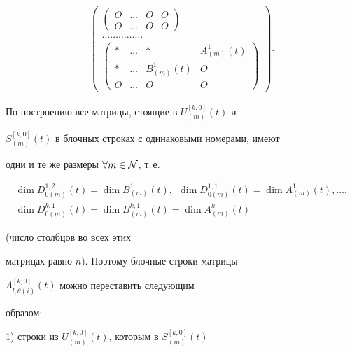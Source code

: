 \begin{pf}
\begin{gather*}
\begin{pmatrix}
\begin{pmatrix}
O & \dotsc & O & O \\


O & \dotsc & O & O 


\end{pmatrix} \\


\dotsc\dotsc\dotsc \dotsc \dotsc\\


\begin{pmatrix}


\ast & \dotsc & \ast & A_{(m)}^{1}(t) \\


\ast & \dotsc & B_{(m)}^1(t) & O \\


O & \dotsc & O & O 


\end{pmatrix}


\end{pmatrix}.


\end{gather*}





По построению все матрицы, стоящие в $U_{(m)}^{[k,0]}(t)$ и


$S_{(m)}^{[k,0]}(t)$ в блочных строках с одинаковыми номерами, имеют 


одни и те же размеры $\forall m \in \cal N$, т.\,е.


\begin{gather*}


\dim 


D_{0(m)}^{1,2}(t)=\dim B_{(m)}^1(t), \ \  \dim D_{0(m)}^{1,1}(t)=\dim 


A_{(m)}^1(t),\dotsc, \\


%


\dim D_{0(m)}^{k,1}(t)=\dim 


B_{(m)}^{k,1}(t)= \dim A_{(m)}^k(t)


\end{gather*}


(число столбцов во всех этих 


матрицах равно $n$). Поэтому блочные строки матрицы 


$\Lambda_{l,\theta (i)}^{[k,0]}(t)$ можно переставить следующим 


образом:





1) строки из $U_{(m)}^{[k,0]}(t)$, которым в $S_{(m)}^{[k,0]}(t)$



\end{pf}
